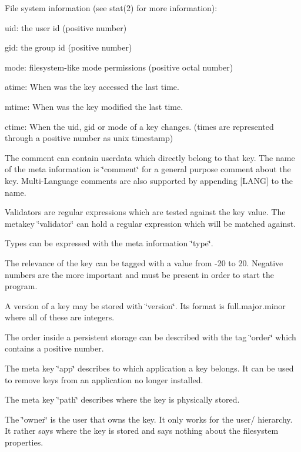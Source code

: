 File system information (see stat(2) for more information)\-:
\begin{DoxyItemize}
\item uid\-: the user id (positive number)
\item gid\-: the group id (positive number)
\item mode\-: filesystem-\/like mode permissions (positive octal number)
\item atime\-: When was the key accessed the last time.
\item mtime\-: When was the key modified the last time.
\item ctime\-: When the uid, gid or mode of a key changes. (times are represented through a positive number as unix timestamp)
\end{DoxyItemize}

The comment can contain userdata which directly belong to that key. The name of the meta information is \char`\"{}comment\char`\"{} for a general purpose comment about the key. Multi-\/\-Language comments are also supported by appending \mbox{[}L\-A\-N\-G\mbox{]} to the name.

Validators are regular expressions which are tested against the key value. The metakey \char`\"{}validator\char`\"{} can hold a regular expression which will be matched against.

Types can be expressed with the meta information \char`\"{}type\char`\"{}.

The relevance of the key can be tagged with a value from -\/20 to 20. Negative numbers are the more important and must be present in order to start the program.

A version of a key may be stored with \char`\"{}version\char`\"{}. Its format is full.\-major.\-minor where all of these are integers.

The order inside a persistent storage can be described with the tag \char`\"{}order\char`\"{} which contains a positive number.

The meta key \char`\"{}app\char`\"{} describes to which application a key belongs. It can be used to remove keys from an application no longer installed.

The meta key \char`\"{}path\char`\"{} describes where the key is physically stored.

The \char`\"{}owner\char`\"{} is the user that owns the key. It only works for the user/ hierarchy. It rather says where the key is stored and says nothing about the filesystem properties. 

